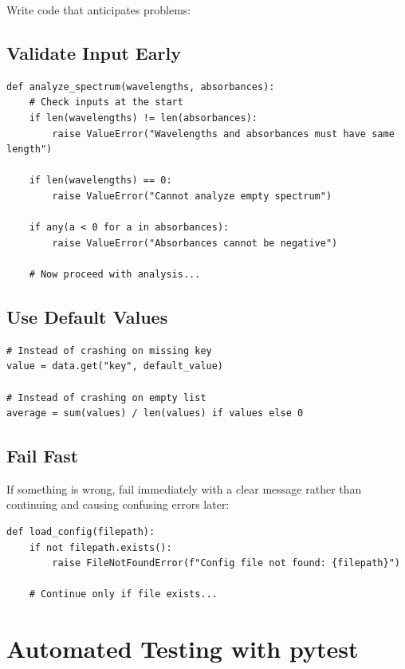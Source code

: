 Write code that anticipates problems:

\subsection{Validate Input Early}

\begin{lstlisting}
def analyze_spectrum(wavelengths, absorbances):
    # Check inputs at the start
    if len(wavelengths) != len(absorbances):
        raise ValueError("Wavelengths and absorbances must have same length")

    if len(wavelengths) == 0:
        raise ValueError("Cannot analyze empty spectrum")

    if any(a < 0 for a in absorbances):
        raise ValueError("Absorbances cannot be negative")

    # Now proceed with analysis...
\end{lstlisting}

\subsection{Use Default Values}

\begin{lstlisting}
# Instead of crashing on missing key
value = data.get("key", default_value)

# Instead of crashing on empty list
average = sum(values) / len(values) if values else 0
\end{lstlisting}

\subsection{Fail Fast}

If something is wrong, fail immediately with a clear message rather than continuing and causing confusing errors later:

\begin{lstlisting}
def load_config(filepath):
    if not filepath.exists():
        raise FileNotFoundError(f"Config file not found: {filepath}")

    # Continue only if file exists...
\end{lstlisting}

\section{Automated Testing with pytest}
\label{sec:pytest}

